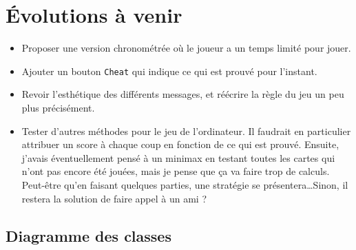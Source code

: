 \documentclass[12pt, algo]{cours}
\newenvironment{a3_landscape}
    {\newpage
    \pdfpagewidth=2\pdfpagewidth
    \hsize=2\hsize
    \textwidth=2\textwidth
    \headwidth=\textwidth}
    {\newpage
    \pdfpagewidth=.5\pdfpagewidth
    \hsize=.5\hsize
    \textwidth=.5\textwidth
    \headwidth=\textwidth}
\begin{document}
\section{Évolutions à venir}

\begin{itemize}
\item Proposer une version chronométrée où le joueur a un temps limité pour jouer.
\item Ajouter un bouton \texttt{Cheat} qui indique ce qui est prouvé pour l'instant.
\item Revoir l'esthétique des différents messages, et réécrire la règle du jeu un peu plus précisément. 
\item Tester d'autres méthodes pour le jeu de l'ordinateur. Il faudrait en particulier attribuer un score à chaque coup en fonction de ce qui est prouvé. Ensuite, j'avais éventuellement pensé à un minimax en testant toutes les cartes qui n'ont pas encore été jouées, mais je pense que ça va faire trop de calculs. Peut-être qu'en faisant quelques parties, une stratégie se présentera\dots Sinon, il restera la solution de faire appel à un ami ?
\end{itemize}

\appendix
\begin{a3_landscape}
\section{Diagramme des classes}
\vspace*{-1cm}

\end{a3_landscape}
\end{document}
